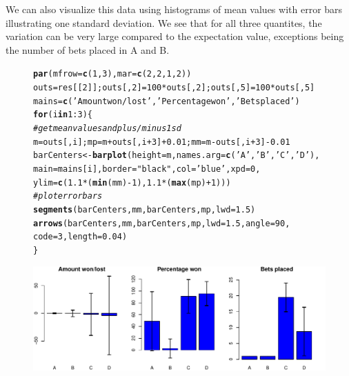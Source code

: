\documentclass[12pt]{article}\usepackage[]{graphicx}\usepackage[]{color}
\makeatletter
\newcommand{\hlnum}[1]{\textcolor[rgb]{0.686,0.059,0.569}{#1}}%
\newcommand{\hlstr}[1]{\textcolor[rgb]{0.192,0.494,0.8}{#1}}%
\newcommand{\hlcom}[1]{\textcolor[rgb]{0.678,0.584,0.686}{\textit{#1}}}%
\newcommand{\hlopt}[1]{\textcolor[rgb]{0,0,0}{#1}}%
\newcommand{\hlstd}[1]{\textcolor[rgb]{0.345,0.345,0.345}{#1}}%
\newcommand{\hlkwa}[1]{\textcolor[rgb]{0.161,0.373,0.58}{\textbf{#1}}}%
\newcommand{\hlkwb}[1]{\textcolor[rgb]{0.69,0.353,0.396}{#1}}%
\newcommand{\hlkwc}[1]{\textcolor[rgb]{0.333,0.667,0.333}{#1}}%
\newcommand{\hlkwd}[1]{\textcolor[rgb]{0.737,0.353,0.396}{\textbf{#1}}}%
\newenvironment{kframe}{%
 \def\at@end@of@kframe{}%
 \ifinner\ifhmode%
  \def\at@end@of@kframe{\end{minipage}}%
  \begin{minipage}{\columnwidth}%
 \fi\fi%
 \def\FrameCommand##1{\hskip\@totalleftmargin \hskip-\fboxsep
 \colorbox{shadecolor}{##1}\hskip-\fboxsep
     \hskip-\linewidth \hskip-\@totalleftmargin \hskip\columnwidth}%
 \MakeFramed {\advance\hsize-\width
   \@totalleftmargin\z@ \linewidth\hsize
   \@setminipage}}%
 {\par\unskip\endMakeFramed%
 \at@end@of@kframe}
\newenvironment{knitrout}{}{} %
\makeatother
\begin{document}
We can also visualize this data using histograms of mean values with error bars illustrating one standard deviation. We see that for all three quantites, the variation can be very large compared to the expectation value, exceptions being the number of bets placed in A and B.

\begin{figure}[h!]
  \centering

\begin{knitrout}
\color{fgcolor}\begin{kframe}
\begin{alltt}
\hlkwd{par}\hlstd{(}\hlkwc{mfrow} \hlstd{=} \hlkwd{c}\hlstd{(}\hlnum{1}\hlstd{,}\hlnum{3}\hlstd{),} \hlkwc{mar}\hlstd{=}\hlkwd{c}\hlstd{(}\hlnum{2}\hlstd{,}\hlnum{2}\hlstd{,}\hlnum{1}\hlstd{,}\hlnum{2}\hlstd{) )}
\hlstd{outs} \hlkwb{=} \hlstd{res[[}\hlnum{2}\hlstd{]]; outs[,}\hlnum{2}\hlstd{]} \hlkwb{=} \hlnum{100}\hlopt{*}\hlstd{outs[,}\hlnum{2}\hlstd{]; outs[,}\hlnum{5}\hlstd{]} \hlkwb{=} \hlnum{100}\hlopt{*}\hlstd{outs[,}\hlnum{5}\hlstd{]}
\hlstd{mains} \hlkwb{=} \hlkwd{c}\hlstd{(}\hlstr{'Amount won/lost'}\hlstd{,} \hlstr{'Percentage won'}\hlstd{,} \hlstr{'Bets placed'}\hlstd{)}
\hlkwa{for} \hlstd{(i} \hlkwa{in} \hlnum{1}\hlopt{:}\hlnum{3}\hlstd{)\{}
  \hlcom{#get mean values and plus/minus 1 sd}
  \hlstd{m} \hlkwb{=} \hlstd{outs[,i]; mp} \hlkwb{=} \hlstd{m} \hlopt{+} \hlstd{outs[,i}\hlopt{+}\hlnum{3}\hlstd{]}\hlopt{+}\hlnum{0.01}\hlstd{;  mm} \hlkwb{=} \hlstd{m} \hlopt{-} \hlstd{outs[,i}\hlopt{+}\hlnum{3}\hlstd{]}\hlopt{-}\hlnum{0.01}
  \hlstd{barCenters} \hlkwb{<-} \hlkwd{barplot}\hlstd{(}\hlkwc{height} \hlstd{= m,} \hlkwc{names.arg} \hlstd{=} \hlkwd{c}\hlstd{(}\hlstr{'A'}\hlstd{,}\hlstr{'B'}\hlstd{,}\hlstr{'C'}\hlstd{,}\hlstr{'D'}\hlstd{),}
                        \hlkwc{main} \hlstd{= mains[i],} \hlkwc{border} \hlstd{=} \hlstr{"black"}\hlstd{,} \hlkwc{col} \hlstd{=} \hlstr{'blue'}\hlstd{,} \hlkwc{xpd}\hlstd{=}\hlnum{0}\hlstd{,}
                          \hlkwc{ylim} \hlstd{=} \hlkwd{c}\hlstd{(}\hlnum{1.1}\hlopt{*}\hlstd{(}\hlkwd{min}\hlstd{(mm)}\hlopt{-}\hlnum{1}\hlstd{),} \hlnum{1.1}\hlopt{*}\hlstd{(}\hlkwd{max}\hlstd{(mp)}\hlopt{+}\hlnum{1}\hlstd{) ) )}
  \hlcom{#plot error bars}
  \hlkwd{segments}\hlstd{(barCenters, mm, barCenters, mp,} \hlkwc{lwd} \hlstd{=} \hlnum{1.5}\hlstd{)}
  \hlkwd{arrows}\hlstd{(barCenters, mm, barCenters,mp,} \hlkwc{lwd} \hlstd{=} \hlnum{1.5}\hlstd{,} \hlkwc{angle} \hlstd{=} \hlnum{90}\hlstd{,}
         \hlkwc{code} \hlstd{=} \hlnum{3}\hlstd{,} \hlkwc{length} \hlstd{=} \hlnum{0.04}\hlstd{)}
\hlstd{\}}
\end{alltt}
\end{kframe}
\includegraphics[width=.9\linewidth]{figure/unnamed-chunk-11-1} 


\end{knitrout}
\end{figure}
\end{document}
